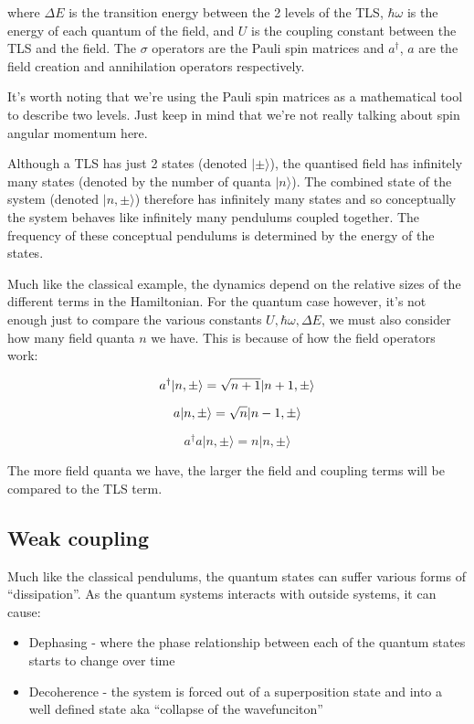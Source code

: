 \documentclass[
]{article}
\renewcommand{\[}{\begin{equation}}
\renewcommand{\]}{\end{equation}}
\providecommand{\tightlist}{%
  \setlength{\itemsep}{0pt}\setlength{\parskip}{0pt}}
\begin{document}
where \(\Delta E\) is the transition energy between the 2 levels of the
TLS, \(\hbar\omega\) is the energy of each quantum of the field, and
\(U\) is the coupling constant between the TLS and the field. The
\(\sigma\) operators are the Pauli spin matrices and \(a^{\dagger}\),
\(a\) are the field creation and annihilation operators respectively.

It's worth noting that we're using the Pauli spin matrices as a
mathematical tool to describe two levels. Just keep in mind that we're
not really talking about spin angular momentum here.

Although a TLS has just 2 states (denoted \(|\pm\rangle\)), the
quantised field has infinitely many states (denoted by the number of
quanta \(|n\rangle\)). The combined state of the system (denoted
\(|n, \pm\rangle\)) therefore has infinitely many states and so
conceptually the system behaves like infinitely many pendulums coupled
together. The frequency of these conceptual pendulums is determined by
the energy of the states.

Much like the classical example, the dynamics depend on the relative
sizes of the different terms in the Hamiltonian. For the quantum case
however, it's not enough just to compare the various constants
\(U, \hbar \omega, \Delta E\), we must also consider how many field
quanta \(n\) we have. This is because of how the field operators work:

\[
a^{\dagger} |n,\pm\rangle = \sqrt{n+1}|n+1,\pm\rangle \\
\]

\[
a |n,\pm\rangle = \sqrt{n}|n-1,\pm\rangle \\
\]

\[
a^{\dagger}a |n,\pm\rangle = n|n,\pm\rangle
\]

The more field quanta we have, the larger the field and coupling terms
will be compared to the TLS term.

\subsection{Weak coupling}\label{weak-coupling-1}

Much like the classical pendulums, the quantum states can suffer various
forms of ``dissipation''. As the quantum systems interacts with outside
systems, it can cause:

\begin{itemize}
\tightlist
\item
  Dephasing - where the phase relationship between each of the quantum
  states starts to change over time
\item
  Decoherence - the system is forced out of a superposition state and
  into a well defined state aka ``collapse of the wavefunciton''
\end{itemize}
\end{document}
